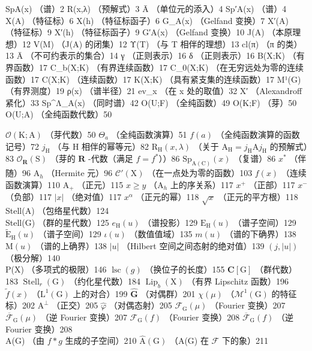 
SpA(x) （谱）2 R(x,λ) （预解式）3 Ā （单位元的添入）4 Sp′A(x) （谱）4 X(A) （特征标）6 X(h) （特征标函子）6 G\_A(x) （Gelfand 变换）7 X′(A) （特征标）9 X′(h) （特征标函子）9 G′A(x) （Gelfand 变换）10 J(A) （本原理想）12 V(M) （J(A) 的闭集）12 Υ(T) （与 T 相伴的理想）13 cl(π) （π 的类）13 Ā （不可约表示的集合）14 γ （正则表示）16 δ （正则表示）16 B(X;K) （有界函数）17 C\_b(X;K) （有界连续函数）17 C\_0(X;K) （在无穷远处为零的连续函数）17 C(X;K) （连续函数）17 K(X;K) （具有紧支集的连续函数）17 M¹(G) （有界测度）19 ρ(x) （谱半径）21 ev\_x （在 x 处的取值）32 X′ （Alexandroff 紧化）33 Sp\^{}Λ\_A(x) （同时谱）42 O(U;F) （全纯函数）49 O(K;F) （芽）50 O(U;A) （全纯函数代数）50



\(\mathcal{O}(\mathrm{K};\mathrm{A})\) （芽代数）50 \(\Theta_{a}\) （全纯函数演算）51 \(f(a)\) （全纯函数演算的函数记号）72 \(j_{\mathrm{H}}\) （与 H 相伴的幂等元）82 \(\mathrm{R_H}(x,\lambda)\) （关于 \(\mathrm{A_H} = j_{\mathrm{H}}\mathrm{A}j_{\mathrm{H}}\) 的预解式）83 \(\mathcal{O}_{\mathbf{R}}(\mathrm{S})\) （芽的 \(\mathbf{R}\) -代数（满足 \(f = f^{*}\)））86 \(\mathrm{Sp}_{\mathrm{A(C)}}(x)\) （复谱）86 \(x^{*}\) （伴随）96 \(\mathrm{A}_h\) （Hermite 元）96 \(\mathcal{C}'(\mathrm{X})\) （在一点处为零的函数）103 \(f(x)\) （连续函数演算）110 \(\mathrm{A}_{+}\) （正元）115 \(x \geqslant y\) （\(\mathrm{A}_h\) 上的序关系）117 \(x^{+}\) （正部）117 \(x^{-}\) （负部）117 \(|x|\) （绝对值）117 \(x^{\alpha}\) （正元的幂）118 \(\sqrt{x}\) （正元的平方根）118\\
Stell(A) （包络星代数）124\\
Stell(G) （群的星代数）125 \(e_{\mathrm{H}}(u)\) （谱投影）129 \(\mathrm{E_H}(u)\) （谱子空间）129 \(\widetilde{\mathrm{E}}_{\mathrm{H}}(u)\) （谱子空间）129 \(\iota(u)\) （数值值域）135 \(m(u)\) （谱的下确界）138 \(\mathrm{M}(u)\) （谱的上确界）138 \(|u|\) （Hilbert 空间之间态射的绝对值）139 \((j,|u|)\) （极分解）140\\
P(X) （多项式的极限）146 \(\operatorname{lsc}(g)\) （换位子的长度）155 \(\mathbf{C}[\mathrm{G}]\) （群代数）183 \(\operatorname{Stell}_r(\mathrm{G})\) （约化星代数）184 \(\operatorname{Lip}_b(\mathrm{X})\) （有界 Lipschitz 函数）196 \(\widetilde{f}(x)\) （\(\mathrm{L}^1 (\mathrm{G})\) 上的对合）199 \(\widehat{\mathbf{G}}\) （对偶群）201 \(\chi (\mu)\) （\(\mathcal{M}^1 (\mathrm{G})\) 的特征标）202 \(\mathrm{A}^{\perp}\) （正交）205 \(\widehat{\varphi}\) （对偶态射）205 \(\mathcal{F}_{\mathrm{G}}(\mu)\) （Fourier 变换）207 \(\overline{\mathcal{F}}_{\mathrm{G}}(\mu)\) （逆 Fourier 变换）207 \(\mathcal{F}_{\mathrm{G}}(f)\) （Fourier 变换）208 \(\overline{\mathcal{F}}_{\mathrm{G}}(f)\) （逆 Fourier 变换）208\\
A(G) （由 \(f*g\) 生成的子空间）210 \(\widehat{\mathrm{A}}(\mathrm{G})\) （A(G) 在 \(\mathcal{F}\) 下的象）211

